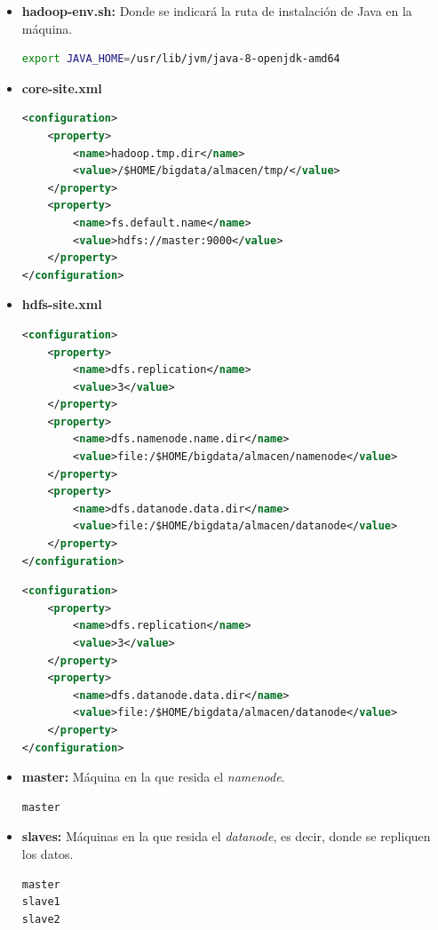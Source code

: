 \begin{itemize}
\item \textbf{hadoop-env.sh:} Donde se indicará la ruta de instalación de Java en la máquina.
\begin{lstlisting}[label=hadoopenv,language=sh,frame=single,caption=Línea a añadir a ``hadoop-env.sh'']
export JAVA_HOME=/usr/lib/jvm/java-8-openjdk-amd64
\end{lstlisting}

\item \textbf{core-site.xml}
\begin{lstlisting}[label=coresite,language=XML,frame=single,caption=Líneas a añadir a ``core-site.xml'']
<configuration>
	<property>
	    <name>hadoop.tmp.dir</name>
	    <value>/$HOME/bigdata/almacen/tmp/</value>
	</property> 
	<property>
	    <name>fs.default.name</name>
	    <value>hdfs://master:9000</value> 
	</property>
</configuration>
\end{lstlisting}

\clearpage
\item \textbf{hdfs-site.xml}
\begin{lstlisting}[label=hdfssite1,language=XML,frame=single,caption=Líneas a añadir a ``hdfs-site.xml'' en el nodo maestro]
<configuration>
	<property>
		<name>dfs.replication</name>
		<value>3</value> 
	</property>
	<property>
		<name>dfs.namenode.name.dir</name>
		<value>file:/$HOME/bigdata/almacen/namenode</value>
	</property>
	<property>
		<name>dfs.datanode.data.dir</name>
		<value>file:/$HOME/bigdata/almacen/datanode</value>
	</property>
</configuration>
\end{lstlisting}

\begin{lstlisting}[label=hdfssite2,language=XML,frame=single,caption=Líneas a añadir a ``hdfs-site.xml'' en los nodos esclavos]
<configuration>
	<property>
		<name>dfs.replication</name>
		<value>3</value> 
	</property>
	<property>
		<name>dfs.datanode.data.dir</name>
		<value>file:/$HOME/bigdata/almacen/datanode</value>
	</property>
</configuration>
\end{lstlisting}

\item \textbf{master:} Máquina en la que resida el \textit{namenode}.
\begin{lstlisting}[label=masterHadoop,language=sh,frame=single,caption=Línea a añadir a ``master'']
master
\end{lstlisting}

\item \textbf{slaves:} Máquinas en la que resida el \textit{datanode}, es decir, donde se repliquen los datos.
\begin{lstlisting}[label=slavesHadoop,language=sh,frame=single,caption=Líneas a añadir a ``slaves'']
master
slave1
slave2
\end{lstlisting}
\end{itemize}

